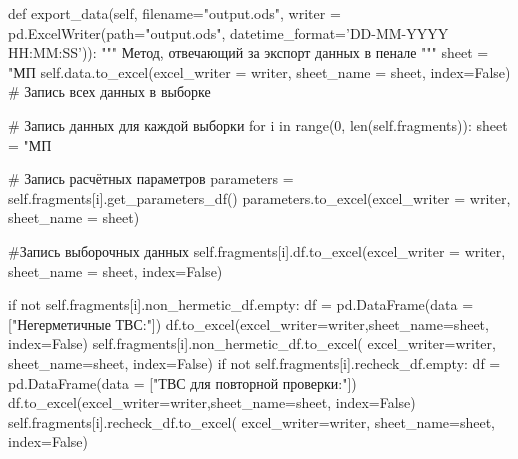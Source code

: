 \begin{flushleft}
 \label{lst:export}
\begin{MyCodes}

def export_data(self, filename="output.ods", 
	writer = pd.ExcelWriter(path="output.ods",
	datetime_format='DD-MM-YYYY HH:MM:SS')):
"""
Метод, отвечающий за экспорт данных в пенале
"""
	sheet = "МП%
	self.data.to_excel(excel_writer = writer, sheet_name = sheet,
		index=False) # Запись всех данных в выборке
	
	# Запись данных для каждой выборки
	for i in range(0, len(self.fragments)):
		sheet = "МП%
		
		# Запись расчётных параметров
		parameters = self.fragments[i].get_parameters_df()
		parameters.to_excel(excel_writer = writer, sheet_name = sheet)
		
		#Запись выборочных данных
		self.fragments[i].df.to_excel(excel_writer = writer,
			sheet_name = sheet, index=False)
		
		if not self.fragments[i].non_hermetic_df.empty:
			df = pd.DataFrame(data = ["Негерметичные ТВС:"])
			df.to_excel(excel_writer=writer,sheet_name=sheet,
				index=False)  
			self.fragments[i].non_hermetic_df.to_excel(
				excel_writer=writer, sheet_name=sheet, index=False)
		if not self.fragments[i].recheck_df.empty:
			df = pd.DataFrame(data = ["ТВС для повторной проверки:"])
			df.to_excel(excel_writer=writer,sheet_name=sheet,
				index=False)
			self.fragments[i].recheck_df.to_excel(
				excel_writer=writer, sheet_name=sheet, index=False)

\end{MyCodes}
\end{flushleft}

